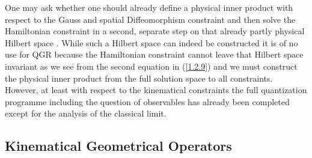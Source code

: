 \documentclass[12pt]{report}
\begin{document}
One may ask whether one should already define a physical inner product 
with respect to the Gauss and spatial Diffeomorphism constraint and then 
solve the Hamiltonian constraint in a second, separate step on that 
already partly physical Hilbert space . While such a Hilbert space can 
indeed be constructed \cite{36a} it is of no use for QGR because the 
Hamiltonian constraint cannot leave that Hilbert space invariant as we 
see from the second equation in (\ref{1.2.9}) and we must construct 
the physical inner product from the full solution space to all constraints.
However, at least with respect to the kinematical constraints the 
full quantization programme including the question of 
observables has already been completed except for the analysis of the 
classical limit. 


\subsection{Kinematical Geometrical Operators}
\label{s2.2.2}
\end{document}
